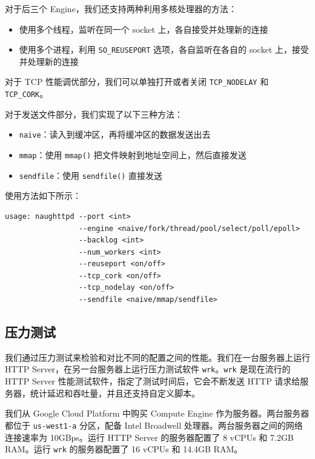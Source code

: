 \documentclass[a4paper]{article}
\providecommand{\tightlist}{\setlength{\itemsep}{0pt}\setlength{\parskip}{0pt}}
\begin{document}
对于后三个 Engine，我们还支持两种利用多核处理器的方法：

\begin{itemize}
\tightlist
\item
  使用多个线程，监听在同一个 socket 上，各自接受并处理新的连接
\item
  使用多个进程，利用 \texttt{SO\_REUSEPORT} 选项，各自监听在各自的 socket 上，接受并处理新的连接
\end{itemize}

对于 TCP 性能调优部分，我们可以单独打开或者关闭 \texttt{TCP\_NODELAY} 和 \texttt{TCP\_CORK}。

对于发送文件部分，我们实现了以下三种方法：

\begin{itemize}
\tightlist
\item
  \texttt{naive}：读入到缓冲区，再将缓冲区的数据发送出去
\item
  \texttt{mmap}：使用 \texttt{mmap()} 把文件映射到地址空间上，然后直接发送
\item
  \texttt{sendfile}：使用 \texttt{sendfile()} 直接发送
\end{itemize}

使用方法如下所示：

\begin{verbatim}
usage: naughttpd --port <int>
                 --engine <naive/fork/thread/pool/select/poll/epoll>
                 --backlog <int>
                 --num_workers <int>
                 --reuseport <on/off>
                 --tcp_cork <on/off>
                 --tcp_nodelay <on/off>
                 --sendfile <naive/mmap/sendfile>
\end{verbatim}

\subsection{压力测试}

我们通过压力测试来检验和对比不同的配置之间的性能。我们在一台服务器上运行 HTTP Server，在另一台服务器上运行压力测试软件 \texttt{wrk}。\texttt{wrk} 是现在流行的 HTTP Server 性能测试软件，指定了测试时间后，它会不断发送 HTTP 请求给服务器，统计延迟和吞吐量，并且还支持自定义脚本。

我们从 Google Cloud Platform 中购买 Compute Engine 作为服务器。两台服务器都位于 \texttt{us-west1-a} 分区，配备 Intel Broadwell 处理器。两台服务器之间的网络连接速率为 10GBps。运行 HTTP Server 的服务器配置了 8 vCPUs 和 7.2GB RAM。运行 \texttt{wrk} 的服务器配置了 16 vCPUs 和 14.4GB RAM。
\end{document}
